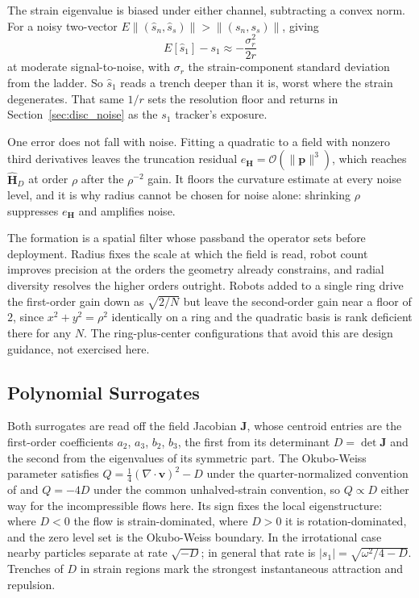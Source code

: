 \documentclass[lettersize,journal]{IEEEtran}
\begin{document}
The strain eigenvalue is biased under either channel, subtracting a
convex norm. For a noisy two-vector $E\lVert(\hat{s}_n,
\hat{s}_s)\rVert > \lVert(s_n, s_s)\rVert$, giving
\begin{equation}
    E[\hat{s}_1] - s_1 \approx -\frac{\sigma_r^2}{2r}
    \label{eq:s1_bias}
\end{equation}
at moderate signal-to-noise, with $\sigma_r$ the strain-component
standard deviation from the ladder. So $\hat{s}_1$ reads a trench
deeper than it is, worst where the strain degenerates. That same $1/r$
sets the resolution floor and returns in Section~\ref{sec:disc_noise}
as the $s_1$ tracker's exposure.

One error does not fall with noise. Fitting a quadratic to a field with
nonzero third derivatives leaves the truncation residual
$e_{\mathbf{H}} = \mathcal{O}(\lVert\mathbf{p}\rVert^3)$, which reaches
$\hat{\mathbf{H}}_D$ at order $\rho$ after the $\rho^{-2}$ gain. It
floors the curvature estimate at every noise level, and it is why
radius cannot be chosen for noise alone: shrinking $\rho$ suppresses
$e_{\mathbf{H}}$ and amplifies noise.

The formation is a spatial filter whose passband the operator sets
before deployment. Radius fixes the scale at which the field is
read, robot count improves precision at the orders the geometry already
constrains, and radial diversity resolves the higher orders outright.
Robots added to a single ring drive the first-order gain down as $\sqrt{2/N}$ but leave the second-order gain near a floor of $2$, since $x^2 + y^2 = \rho^2$ identically on a ring and the quadratic basis is rank deficient there for any $N$. The ring-plus-center configurations that avoid this are design guidance, not exercised here.

\subsection{Polynomial Surrogates}
\label{sec:surrogates}

Both surrogates are read off the field Jacobian $\mathbf{J}$, whose
centroid entries are the first-order coefficients $a_2$, $a_3$, $b_2$,
$b_3$, the first from its determinant $D = \det \mathbf{J}$ and the
second from the eigenvalues of its symmetric part. The Okubo-Weiss
parameter \cite{21,22} satisfies $Q = \tfrac{1}{4} (\nabla \cdot
\mathbf{v})^2 - D$ under the quarter-normalized convention of
\cite{24} and $Q = -4D$ under the common unhalved-strain convention, so
$Q \propto D$ either way for the incompressible flows here. Its sign
fixes the local eigenstructure: where $D < 0$ the
flow is strain-dominated, where $D > 0$ it is rotation-dominated, and
the zero level set is the Okubo-Weiss boundary. In the irrotational
case nearby particles separate at rate $\sqrt{-D}$; in general that
rate is $\lvert s_1 \rvert = \sqrt{\omega^2/4 - D}$.
Trenches of $D$ in strain regions mark the strongest instantaneous attraction and repulsion.
\end{document}
